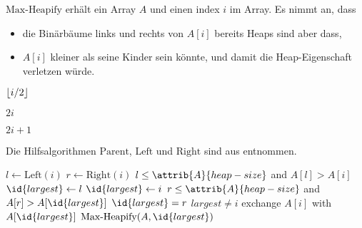 $\text{Max-Heapify}$ erhält ein Array $A$ und einen index $i$ im Array. Es nimmt an, dass
\begin{itemize}
    \item die Binärbäume links und rechts von $A[i]$ bereits Heaps sind aber dass,
    \item $A[i]$ kleiner als seine Kinder sein könnte, und damit die Heap-Eigenschaft verletzen würde.
\end{itemize}

\begin{minipage}{\textwidth}
    \begin{minipage}[t]{.33\textwidth}
        \begin{codebox}
            \li \Return $\left\lfloor i/2 \right\rfloor$
        \end{codebox}
    \end{minipage}
    \begin{minipage}[t]{.33\textwidth}
        \begin{codebox}
            \li \Return $2i$
        \end{codebox}
    \end{minipage}
    \begin{minipage}[t]{.33\textwidth}
        \begin{codebox}
            \li \Return $2i + 1$
        \end{codebox}
    \end{minipage}
\end{minipage}

Die Hilfsalgorithmen $\text{Parent}$, $\text{Left}$ und $\text{Right}$ sind aus \cite[152]{clrs2001} entnommen.

\begin{codebox}
    \li $l \gets \text{Left}(i)$\label{ln:heapify-get-largest-begin}
    \li $r \gets \text{Right}(i)$
    \li \If $l \leq \attrib{A}{heap-size}$ and $A[l] > A[i]$
    \li      \Then
                $\id{largest} \gets l$
    \li     \Else
                $\id{largest} \gets i$
            \End
    \li \If $r \leq \attrib{A}{heap-size}$ and $A[r] > A[\id{largest}]$
    \li     \Then
                $\id{largest} = r$
            \End\label{ln:heapify-get-largest-end}
    \li \If $largest \neq i$ \label{ln:heapify-largest}
    \li     \Then
                exchange $A[i]$ with $A[\id{largest}]$\label{ln:heapify-exchange}
    \li         $\text{Max-Heapify}(A, \id{largest})$\label{ln:heapify-recursion}
            \End
\end{codebox}


